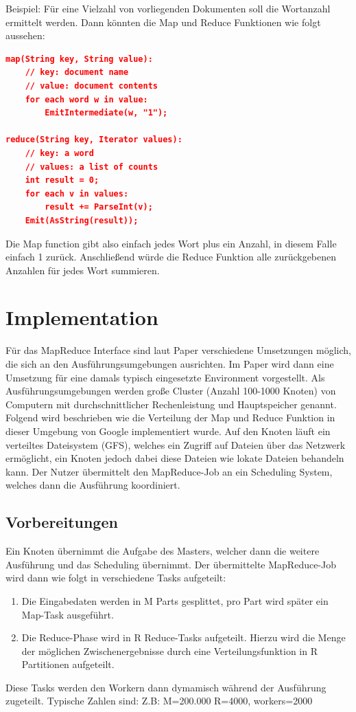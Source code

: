 Beispiel:
Für eine Vielzahl von vorliegenden Dokumenten soll die Wortanzahl ermittelt werden.
Dann könnten die Map und Reduce Funktionen wie folgt aussehen:

\begin{lstlisting}[language=json,firstnumber=1]
map(String key, String value):
	// key: document name
	// value: document contents
	for each word w in value:
		EmitIntermediate(w, "1");

reduce(String key, Iterator values):
	// key: a word
	// values: a list of counts
	int result = 0;
	for each v in values:
		result += ParseInt(v);
	Emit(AsString(result));

\end{lstlisting}

Die Map function gibt also einfach jedes Wort plus ein Anzahl, in diesem Falle einfach 1 zurück.
Anschließend würde die Reduce Funktion alle zurückgebenen Anzahlen für jedes Wort summieren.



\section{Implementation}

Für das MapReduce Interface sind laut Paper \cite{mapReduce} verschiedene Umsetzungen möglich, die sich an den  Ausführungsumgebungen ausrichten.
Im Paper wird dann eine Umsetzung für eine damals typisch eingesetzte Environment vorgestellt.
Als Ausführungsumgebungen werden große Cluster (Anzahl 100-1000 Knoten) von Computern mit durchschnittlicher Rechenleistung und Hauptspeicher genannt.
Folgend wird beschrieben wie die Verteilung der Map und Reduce Funktion in dieser Umgebung von Google implementiert wurde.
Auf den Knoten läuft ein verteiltes Dateisystem (GFS), welches ein Zugriff auf Dateien über das Netzwerk ermöglicht, ein Knoten jedoch dabei diese Dateien wie lokate Dateien behandeln kann.
Der Nutzer übermittelt den MapReduce-Job an ein Scheduling System, welches dann die Ausführung koordiniert.


\subsection*{Vorbereitungen}
Ein Knoten übernimmt die Aufgabe des Masters, welcher dann die weitere Ausführung und das Scheduling übernimmt.
Der übermittelte MapReduce-Job wird dann wie folgt in verschiedene Tasks aufgeteilt:
\begin{enumerate}
	\item
	Die Eingabedaten werden in M Parts gesplittet, pro Part wird später ein Map-Task ausgeführt.
	\item
	Die Reduce-Phase wird in R Reduce-Tasks aufgeteilt.
	Hierzu wird die Menge der möglichen Zwischenergebnisse
	durch eine Verteilungsfunktion in R Partitionen aufgeteilt.
\end{enumerate}
Diese Tasks werden den Workern dann dymamisch während der Ausführung zugeteilt.
Typische Zahlen sind: Z.B: M=200.000 R=4000, workers=2000

